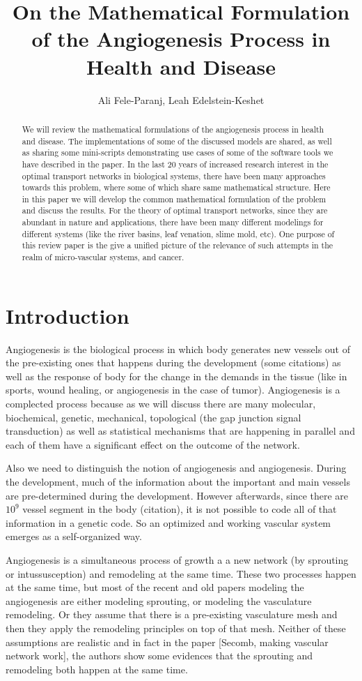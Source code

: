 \documentclass[10pt,a4paper,twocolumn]{article}
\title{On the Mathematical Formulation of the Angiogenesis Process in Health and Disease}
\author{Ali Fele-Paranj, Leah Edelstein-Keshet}
\begin{document}
	\maketitle
	\begin{abstract}
		We will review the mathematical formulations of the angiogenesis process in health and disease. The implementations of some of the discussed models are shared, as well as sharing some mini-scripts demonstrating use cases of some of the software tools we have described in the paper. In the last 20 years of increased research interest in the optimal transport networks in biological systems, there have been many approaches towards this problem, where some of which share same mathematical structure. Here in this paper we will develop the common mathematical formulation of the problem and discuss the results.
		For the theory of optimal transport networks, since they are abundant in nature and applications, there have been many different modelings for different systems (like the river basins, leaf venation, slime mold, etc). One purpose of this review paper is the give a unified picture of the relevance of such attempts in the realm of micro-vascular systems, and cancer. 
	\end{abstract}
	\section{Introduction}
	Angiogenesis is the biological process in which body generates new vessels out of the pre-existing ones that happens during the development (some citations) as well as the response of body for the change in the demands in the tissue (like in sports, wound healing, or angiogenesis in the case of tumor). Angiogenesis is a complected process because as we will discuss there are many molecular, biochemical, genetic, mechanical, topological (the gap junction signal transduction) as well as statistical mechanisms that are happening in parallel and each of them have a significant effect on the outcome of the network. 
	
	Also we need to distinguish the notion of angiogenesis and angiogenesis. During the development, much of the information about the important and main vessels are pre-determined during the development. However afterwards, since there are $10^9$ vessel segment in the body (citation), it is not possible to code all of that information in a genetic code. So an optimized and working vascular system emerges as a self-organized way.
	
	Angiogenesis is a simultaneous process of growth a a new network (by sprouting or intussusception) and remodeling at the same time. These two processes happen at the same time, but most of the recent and old papers modeling the angiogenesis are either modeling sprouting, or modeling the vasculature remodeling. Or they assume that there is a pre-existing vasculature mesh and then they apply the remodeling principles on top of that mesh. Neither of these assumptions are realistic and in fact in the paper [Secomb, making vascular network work], the authors show some evidences that the sprouting and remodeling both happen at the same time.
	
\end{document}
